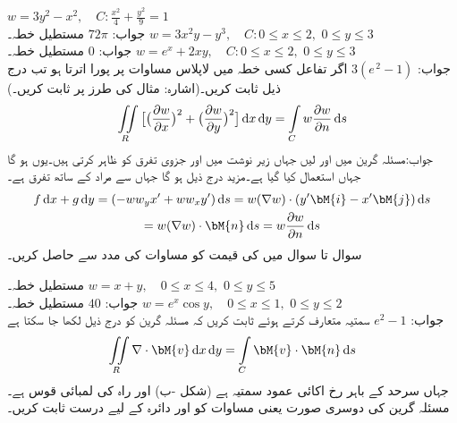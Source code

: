  \quad
$w=3y^2-x^2,\quad C:\tfrac{x^2}{4}+\tfrac{y^2}{9}=1$\\
جواب:\quad
$72\pi$
 \quad مستطیل خطہ۔\quad
$w=3x^2y-y^3,\quad C:0\le x\le 2,\,\, 0\le y\le 3$\\
جواب:\quad
$0$
 \quad مستطیل خطہ۔\quad
$w=e^x+2xy,\quad C:0\le x\le 2,\,\, 0\le y\le 3$\\
جواب:\quad
$3(e^{\,2}-1)$
\quad اگر تفاعل  کسی خطہ  میں لاپلاس مساوات  پر پورا اترتا ہو تب درج ذیل ثابت کریں۔(اشارہ: مثال  کی طرز پر ثابت کریں۔) 
\begin{align}\label{مساوات_خطی_تکمل_لاپلاسی_تعلق_ب}
\iint\limits_R \big[\big(\frac{\partial w}{\partial x}\big)^2+\big(\frac{\partial w}{\partial y}\big)^2\big]\dif x\dif y=\int\limits_C w\frac{\partial w}{\partial n}\dif s
\end{align}
جواب:مسئلہ گرین میں  اور  لیں جہاں زیر نوشت میں  اور  جزوی تفرق کو ظاہر کرتی ہیں۔یوں 
 ہو گا جہاں  استعمال کیا گیا ہے۔مزید درج ذیل ہو گا جہاں  سے مراد  کے ساتھ تفرق ہے۔
\begin{multline*}
f\dif x+g\dif y=(-ww_yx'+ww_xy')\dif s=w(\nabla w)\cdot (y'\bM{i}-x'\bM{j})\dif s\\
=w(\nabla w)\cdot \bM{n}\dif s=w\frac{\partial w}{\partial n}\dif s
\end{multline*}
سوال  تا سوال  میں  کی قیمت کو مساوات  کی مدد سے حاصل کریں۔

\quad مستطیل خطہ۔
$w=x+y,\quad 0\le x\le 4,\,\, 0 \le y \le 5$\\
جواب:\quad
$40$
\quad مستطیل خطہ۔
$w=e^x\cos y,\quad 0\le x\le 1,\,\, 0 \le y \le 2$\\
جواب:\quad
$e^2-1$
\quad
سمتیہ  متعارف کرتے ہوئے ثابت کریں کہ مسئلہ گرین  کو درج ذیل لکھا جا سکتا ہے
\begin{align}\label{مساوات_خطی_تکمل_مسئلہ_گرین_دوسری_صورت}
\iint\limits_R \nabla \cdot \bM{v}\dif x\dif y=\int\limits_C \bM{v}\cdot \bM{n}\dif s
\end{align}
جہاں  سرحد کے  باہر رخ  اکائی  عمود سمتیہ ہے (شکل -ب)  اور  راہ  کی لمبائی قوس ہے۔ 
مسئلہ گرین کی دوسری صورت یعنی مساوات  کو  اور دائرہ  کے لیے درست ثابت کریں۔

